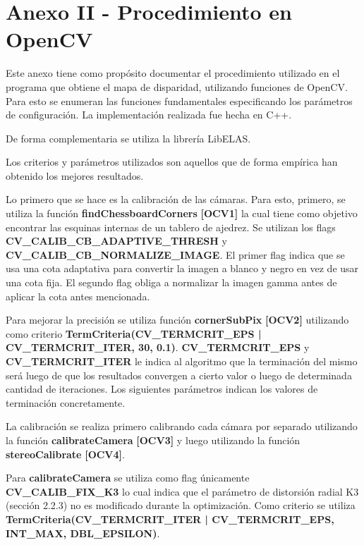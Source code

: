 \documentclass[11pt,a4paper,titlepage]{article}
\begin{document}
\section{Anexo II - Procedimiento en OpenCV}

Este anexo tiene como propósito documentar el procedimiento utilizado en el programa que obtiene el mapa de disparidad, utilizando funciones de OpenCV. Para esto se enumeran las funciones fundamentales especificando los parámetros de configuración. La implementación realizada fue hecha en C++.

De forma complementaria se utiliza la librería LibELAS.

Los criterios y parámetros utilizados son aquellos que de forma empírica han obtenido los mejores resultados.

Lo primero que se hace es la calibración de las cámaras. Para esto, primero, se utiliza la función \textbf{findChessboardCorners} \textbf{[OCV1]} la cual tiene como objetivo encontrar las esquinas internas de un tablero de ajedrez. Se utilizan los flags \textbf{CV\_CALIB\_CB\_ADAPTIVE\_THRESH} y \textbf{CV\_CALIB\_CB\_NORMALIZE\_IMAGE}. El primer flag indica que se usa una cota adaptativa para convertir la imagen a blanco y negro en vez de usar una cota fija. El segundo flag obliga a normalizar la imagen gamma antes de aplicar la cota antes mencionada.

\begin{sloppypar}
Para mejorar la precisión se utiliza función \textbf{cornerSubPix} \textbf{[OCV2]} utilizando como criterio \textbf{TermCriteria(CV\_TERMCRIT\_EPS | CV\_TERMCRIT\_ITER, 30, 0.1)}.
\textbf{CV\_TERMCRIT\_EPS} y \textbf{CV\_TERMCRIT\_ITER} le indica al algoritmo que la terminación del mismo será luego de que los resultados convergen a cierto valor o luego de determinada cantidad de iteraciones. Los siguientes parámetros indican los valores de terminación concretamente.
\end{sloppypar}

La calibración se realiza primero calibrando cada cámara por separado utilizando la función \textbf{calibrateCamera} \textbf{[OCV3]} y luego utilizando la función \textbf{stereoCalibrate} \textbf{[OCV4]}.

\begin{sloppypar}
Para \textbf{calibrateCamera} se utiliza como flag únicamente \textbf{CV\_CALIB\_FIX\_K3} lo cual indica que el parámetro de distorsión radial K3 (sección 2.2.3) no es modificado durante la optimización. Como criterio se utiliza \textbf{TermCriteria(CV\_TERMCRIT\_ITER | CV\_TERMCRIT\_EPS, INT\_MAX, DBL\_EPSILON)}.
\end{sloppypar}
\end{document}
